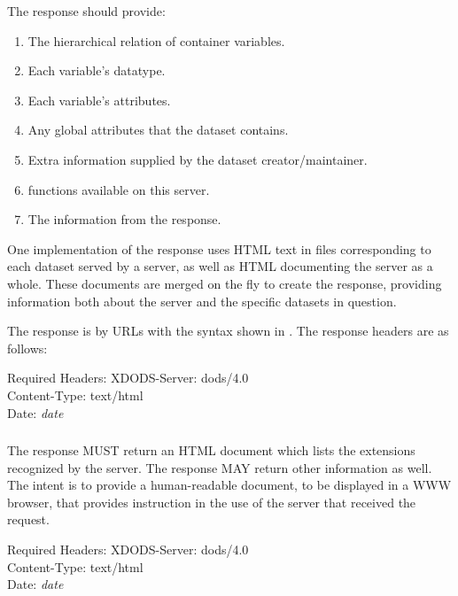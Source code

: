 \documentclass[justify]{dods-paper}
\begin{document}
The \INFO response should provide:

\begin{enumerate}
\item The hierarchical relation of container variables.
\item Each variable's datatype.
\item Each variable's attributes.
\item Any global attributes that the dataset contains.
\item Extra information supplied by the dataset creator/maintainer.
\item \CE functions available on this server.
\item The information from the \VER response.
\end{enumerate}

One implementation of the \INFO response uses HTML text in files
corresponding to each dataset served by a server, as well as HTML
documenting the server as a whole.  These documents are merged on the
fly to create the \INFO response, providing information both about the
server and the specific datasets in question.  

The \INFO response is by URLs with the syntax shown in
.  The response headers are as follows:

\begin{textoutput}{Required Headers:}
XDODS-Server: dods/4.0\\
Content-Type: text/html\\
Date: \emph{date}
\end{textoutput}


\subsubsection{\HELP}

The \HELP response MUST return an HTML document which lists the
extensions recognized by the server.  The response MAY return other
information as well.  The intent is to provide a human-readable
document, to be displayed in a WWW browser, that provides instruction
in the use of the server that received the request.

\begin{textoutput}{Required Headers:}
XDODS-Server: dods/4.0\\
Content-Type: text/html\\
Date: \emph{date}
\end{textoutput}
\end{document}
